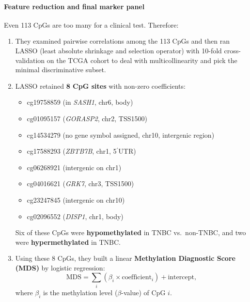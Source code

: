\documentclass[10pt]{extarticle}
\begin{document}
\paragraph{Feature reduction and final marker panel}
Even 113 CpGs are too many for a clinical test. Therefore:
\begin{enumerate}
    \item They examined pairwise correlations among the 113 CpGs and then ran LASSO (least absolute shrinkage and selection operator) with 10-fold cross-validation on the TCGA cohort to deal with multicollinearity and pick the minimal discriminative subset.
    \item LASSO retained \textbf{8 CpG sites} with non-zero coefficients:
    \begin{itemize}[label=-]
        \item cg19758859 (in \textit{SASH1}, chr6, body)
        \item cg01095157 (\textit{GORASP2}, chr2, TSS1500)
        \item cg14534279 (no gene symbol assigned, chr10, intergenic region)
        \item cg17588293 (\textit{ZBTB7B}, chr1, 5$^\prime$UTR)
        \item cg06268921 (intergenic on chr1)
        \item cg04016621 (\textit{GRK7}, chr3, TSS1500)
        \item cg23247845 (intergenic on chr10)
        \item cg02096552 (\textit{DISP1}, chr1, body)
    \end{itemize}
    Six of these CpGs were \textbf{hypomethylated} in TNBC vs.\ non-TNBC, and two were \textbf{hypermethylated} in TNBC. 
    \item Using these 8 CpGs, they built a linear \textbf{Methylation Diagnostic Score (MDS)} by logistic regression:
    \[
        \mathrm{MDS} = \sum_i (\beta_i \times \text{coefficient}_i) + \text{intercept},
    \]
    where \(\beta_i\) is the methylation level (\(\beta\)-value) of CpG \(i\). 
\end{enumerate}
\end{document}
